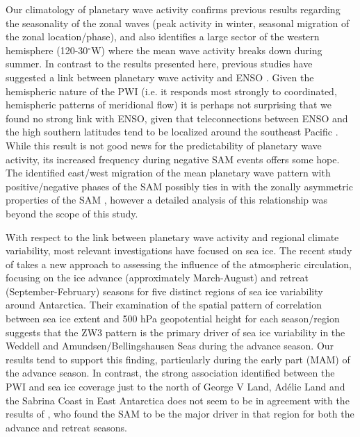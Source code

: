 Our climatology of planetary wave activity confirms previous results regarding the seasonality of the zonal waves (peak activity in winter, seasonal migration of the zonal location/phase), and also identifies a large sector of the western hemisphere (120-30$^{\circ}$W) where the mean wave activity breaks down during summer. In contrast to the results presented here, previous studies have suggested a link between planetary wave activity and ENSO \citep[e.g.][]{Trenberth1980,Raphael2003,Hobbs2007}. Given the hemispheric nature of the PWI (i.e. it responds most strongly to coordinated, hemispheric patterns of meridional flow) it is perhaps not surprising that we found no strong link with ENSO, given that teleconnections between ENSO and the high southern latitudes tend to be localized around the southeast Pacific \citep{Simmonds1995,Turner2004}. While this result is not good news for the predictability of planetary wave activity, its increased frequency during negative SAM events offers some hope. The identified east/west migration of the mean planetary wave pattern with positive/negative phases of the SAM possibly ties in with the zonally asymmetric properties of the SAM \citep[e.g.][]{Kidson1988,Kidston2009}, however a detailed analysis of this relationship was beyond the scope of this study.

With respect to the link between planetary wave activity and regional climate variability, most relevant investigations have focused on sea ice. The recent study of \citet{Raphael2014} takes a new approach to assessing the influence of the atmospheric circulation, focusing on the ice advance (approximately March-August) and retreat (September-February) seasons for five distinct regions of sea ice variability around Antarctica. Their examination of the spatial pattern of correlation between sea ice extent and 500 hPa geopotential height for each season/region suggests that the ZW3 pattern is the primary driver of sea ice variability in the Weddell and Amundsen/Bellingshausen Seas during the advance season. Our results tend to support this finding, particularly during the early part (MAM) of the advance season. In contrast, the strong association identified between the PWI and sea ice coverage just to the north of George V Land, Ad{\'e}lie Land and the Sabrina Coast in East Antarctica does not seem to be in agreement with the results of \citet{Raphael2014}, who found the SAM to be the major driver in that region for both the advance and retreat seasons.

